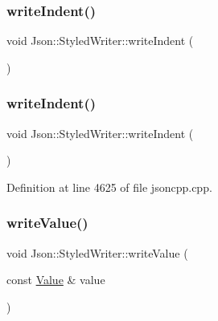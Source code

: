 \subsubsection{\texorpdfstring{write\+Indent()}{writeIndent()}\hspace{0.1cm}{\footnotesize\ttfamily [1/2]}}
{\footnotesize\ttfamily void Json\+::\+Styled\+Writer\+::write\+Indent (\begin{DoxyParamCaption}{ }\end{DoxyParamCaption})\hspace{0.3cm}{\ttfamily [private]}}

\hypertarget{class_json_1_1_styled_writer_a885f4bfb5701896d60eee6716d2db7e4}{}\label{class_json_1_1_styled_writer_a885f4bfb5701896d60eee6716d2db7e4} 
\subsubsection{\texorpdfstring{write\+Indent()}{writeIndent()}\hspace{0.1cm}{\footnotesize\ttfamily [2/2]}}
{\footnotesize\ttfamily void Json\+::\+Styled\+Writer\+::write\+Indent (\begin{DoxyParamCaption}{ }\end{DoxyParamCaption})\hspace{0.3cm}{\ttfamily [private]}}



Definition at line 4625 of file jsoncpp.\+cpp.

\hypertarget{class_json_1_1_styled_writer_ac40143cf43f7c4a94d3d0b41e5245069}{}\label{class_json_1_1_styled_writer_ac40143cf43f7c4a94d3d0b41e5245069} 
\subsubsection{\texorpdfstring{write\+Value()}{writeValue()}\hspace{0.1cm}{\footnotesize\ttfamily [1/2]}}
{\footnotesize\ttfamily void Json\+::\+Styled\+Writer\+::write\+Value (\begin{DoxyParamCaption}\item[{const \hyperlink{class_json_1_1_value}{Value} \&}]{value }\end{DoxyParamCaption})\hspace{0.3cm}{\ttfamily [private]}}

